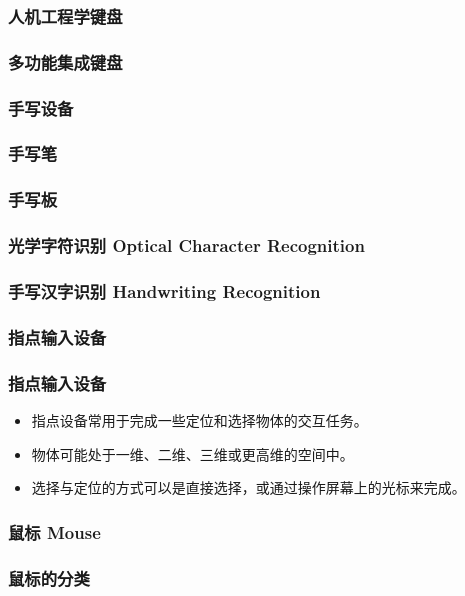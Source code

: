 \documentclass{beamer}
\begin{document}
\begin{frame}
	\frametitle{人机工程学键盘}

\end{frame}

\begin{frame}
	\frametitle{多功能集成键盘}

\end{frame}

\begin{frame}
	\frametitle{手写设备}

\end{frame}

\begin{frame}
	\frametitle{手写笔}

\end{frame}

\begin{frame}
	\frametitle{手写板}

\end{frame}

\begin{frame}
	\frametitle{光学字符识别 Optical Character Recognition}

\end{frame}

\begin{frame}
	\frametitle{手写汉字识别 Handwriting Recognition}

\end{frame}

\subsubsection{指点输入设备}
\begin{frame}
	\frametitle{指点输入设备}
	\begin{itemize}
		\item 指点设备常用于完成一些定位和选择物体的交互任务。
		\item 物体可能处于一维、二维、三维或更高维的空间中。
		\item 选择与定位的方式可以是直接选择，或通过操作屏幕上的光标来完成。
	\end{itemize}
\end{frame}

\begin{frame}
	\frametitle{鼠标 Mouse}

\end{frame}

\begin{frame}
	\frametitle{鼠标的分类}

\end{frame}
\end{document}

